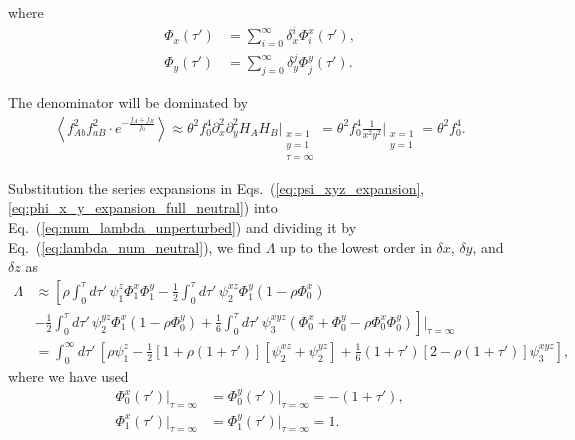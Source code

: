 \documentclass[11pt]{article}
\begin{document}
where
\begin{subequations}\label{eq:phi_x_y_expansion_full_neutral}
    \begin{align}
        \Phi_x(\tau') &= \sum_{i=0}^{\infty} \delta^i_x \Phi^x_i (\tau'), \\
        \Phi_y(\tau') &= \sum_{j=0}^{\infty} \delta^j_y \Phi^y_j (\tau').
    \end{align}
\end{subequations}

The denominator will be dominated by 
\begin{align}\label{eq:lambda_num_neutral}
    \left\langle f_{Ab}^2 f_{aB}^2 \cdot e^{-\frac{f_A + f_B}{f_0}}\right\rangle \approx \theta^2 f_0^4 \partial_x^2 \partial_y^2 H_A H_B \Bigg\vert_{\substack{x=1 \\ y=1 \\ \tau=\infty}} = \theta^2 f_0^4 \frac{1}{x^2y^2}\Bigg\vert_{\substack{x=1 \\ y=1}} = \theta^2 f_0^4.
\end{align}

Substitution the series expansions in Eqs.~(\ref{eq:psi_xyz_expansion}, \ref{eq:phi_x_y_expansion_full_neutral}) into Eq.~(\ref{eq:num_lambda_unperturbed}) and dividing it by Eq.~(\ref{eq:lambda_num_neutral}), we find $\Lambda$ up to the lowest order in $\delta x$, $\delta y$, and $\delta z$ as
\begin{align}\label{eq:num_lambda_unperturbed}
    \Lambda & \approx{} 
     \left[ \rho \int_0^{\tau} d\tau'\, \psi_1^z \Phi_1^x \Phi_1^y - \frac{1}{2} \int_0^{\tau} d\tau'\, \psi_2^{xz} \Phi_1^y \left(1-\rho \Phi_0^x\right) \right. \\ \nonumber
    & - \frac{1}{2} \left. \int_0^{\tau} d\tau'\, \psi_2^{yz} \Phi_1^x \left(1-\rho \Phi_0^y\right) + \frac{1}{6} \int_0^{\tau} d\tau'\,  \psi_3^{xyz} (\Phi_0^x + \Phi_0^y -\rho \Phi_0^x\Phi_0^y)
    \right]\Bigg\vert_{\tau=\infty} \\ \nonumber
    & = \int_0^{\infty} d\tau'\, \left[ \rho \psi_1^z - \frac{1}{2}\left[1+\rho(1+\tau')\right]\left[\psi_2^{xz} + \psi_2^{yz}\right] + \frac{1}{6} (1+\tau') \left[2-\rho(1+\tau')\right] \psi_3^{xyz} \right],
\end{align}
where we have used 
\begin{subequations}
    \begin{align}
        \Phi_0^x(\tau') \Bigg\vert_{\tau=\infty} &= \Phi_0^y(\tau') \Bigg\vert_{\tau=\infty} = -(1+\tau'), \\
        \Phi_1^x(\tau') \Bigg\vert_{\tau=\infty} &= \Phi_1^y(\tau') \Bigg\vert_{\tau=\infty} = 1.
    \end{align}
\end{subequations} \\
\end{document}
